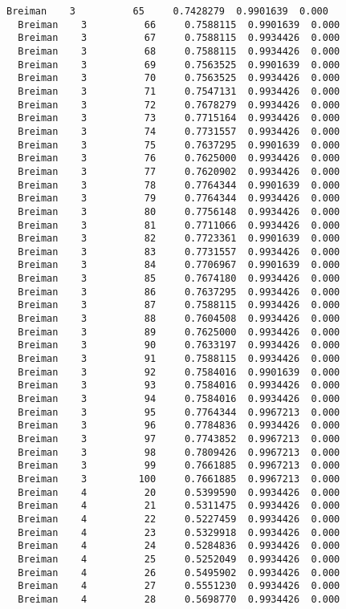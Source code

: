 \documentclass[11pt]{article}
\begin{document}
\begin{Verbatim}[commandchars=\\\{\}]
  Breiman    3          65     0.7428279  0.9901639  0.000
  Breiman    3          66     0.7588115  0.9901639  0.000
  Breiman    3          67     0.7588115  0.9934426  0.000
  Breiman    3          68     0.7588115  0.9934426  0.000
  Breiman    3          69     0.7563525  0.9901639  0.000
  Breiman    3          70     0.7563525  0.9934426  0.000
  Breiman    3          71     0.7547131  0.9934426  0.000
  Breiman    3          72     0.7678279  0.9934426  0.000
  Breiman    3          73     0.7715164  0.9934426  0.000
  Breiman    3          74     0.7731557  0.9934426  0.000
  Breiman    3          75     0.7637295  0.9901639  0.000
  Breiman    3          76     0.7625000  0.9934426  0.000
  Breiman    3          77     0.7620902  0.9934426  0.000
  Breiman    3          78     0.7764344  0.9901639  0.000
  Breiman    3          79     0.7764344  0.9934426  0.000
  Breiman    3          80     0.7756148  0.9934426  0.000
  Breiman    3          81     0.7711066  0.9934426  0.000
  Breiman    3          82     0.7723361  0.9901639  0.000
  Breiman    3          83     0.7731557  0.9934426  0.000
  Breiman    3          84     0.7706967  0.9901639  0.000
  Breiman    3          85     0.7674180  0.9934426  0.000
  Breiman    3          86     0.7637295  0.9934426  0.000
  Breiman    3          87     0.7588115  0.9934426  0.000
  Breiman    3          88     0.7604508  0.9934426  0.000
  Breiman    3          89     0.7625000  0.9934426  0.000
  Breiman    3          90     0.7633197  0.9934426  0.000
  Breiman    3          91     0.7588115  0.9934426  0.000
  Breiman    3          92     0.7584016  0.9901639  0.000
  Breiman    3          93     0.7584016  0.9934426  0.000
  Breiman    3          94     0.7584016  0.9934426  0.000
  Breiman    3          95     0.7764344  0.9967213  0.000
  Breiman    3          96     0.7784836  0.9934426  0.000
  Breiman    3          97     0.7743852  0.9967213  0.000
  Breiman    3          98     0.7809426  0.9967213  0.000
  Breiman    3          99     0.7661885  0.9967213  0.000
  Breiman    3         100     0.7661885  0.9967213  0.000
  Breiman    4          20     0.5399590  0.9934426  0.000
  Breiman    4          21     0.5311475  0.9934426  0.000
  Breiman    4          22     0.5227459  0.9934426  0.000
  Breiman    4          23     0.5329918  0.9934426  0.000
  Breiman    4          24     0.5284836  0.9934426  0.000
  Breiman    4          25     0.5252049  0.9934426  0.000
  Breiman    4          26     0.5495902  0.9934426  0.000
  Breiman    4          27     0.5551230  0.9934426  0.000
  Breiman    4          28     0.5698770  0.9934426  0.000

\end{Verbatim}
\end{document}
